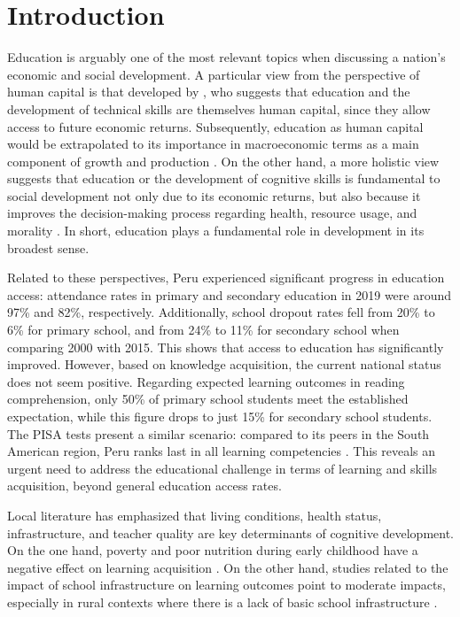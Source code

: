 \documentclass[12pt]{article}
\begin{document}
\newpage
\setcounter{page}{1}

\section{Introduction}
\label{sec:intro}

Education is arguably one of the most relevant topics when discussing a
nation's economic and social development. A particular view from the
perspective of human capital is that developed by \citet{becker1964}, who
suggests that education and the development of technical skills are themselves
human capital, since they allow access to future economic returns.
Subsequently, education as human capital would be extrapolated to its
importance in macroeconomic terms as a main component of growth and production
\citep{barro2002, romer1989}. On the other hand, a more holistic view suggests
that education or the development of cognitive skills is fundamental to social
development not only due to its economic returns, but also because it improves
the decision-making process regarding health, resource usage, and morality
\citep{busemeyer2018}. In short, education plays a fundamental role in
development in its broadest sense.

Related to these perspectives, Peru experienced significant progress in
education access: attendance rates in primary and secondary education in 2019
were around 97\% and 82\%, respectively. Additionally, school dropout rates
fell from 20\% to 6\% for primary school, and from 24\% to 11\% for secondary
school when comparing 2000 with 2015. This shows that access to education has
significantly improved. However, based on knowledge acquisition, the current
national status does not seem positive. Regarding expected learning outcomes
in reading comprehension, only 50\% of primary school students meet the
established expectation, while this figure drops to just 15\% for secondary
school students. The PISA tests present a similar scenario: compared to its
peers in the South American region, Peru ranks last in all learning
competencies \citep{minedu2019}. This reveals an urgent need to address the
educational challenge in terms of learning and skills acquisition, beyond
general education access rates.

Local literature has emphasized that living conditions, health status,
infrastructure, and teacher quality are key determinants of cognitive
development. On the one hand, poverty and poor nutrition during early childhood
have a negative effect on learning acquisition \citep{grantham2007,
sanchez2013}. On the other hand, studies related to the impact of school
infrastructure on learning outcomes point to moderate impacts, especially in
rural contexts where there is a lack of basic school infrastructure
\citep{campana2014}.
\end{document}
